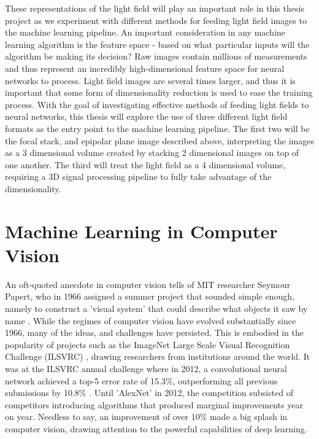 \documentclass[openany]{book}
\begin{document}
These representations of the light field will play an important role in this thesis project as we experiment with different methods for feeding light field images to the machine learning pipeline. An important consideration in any machine learning algorithm is the feature space - based on what particular inputs will the algorithm be making its decision? Raw images contain millions of measurements and thus represent an incredibly high-dimensional feature space for neural networks to process. Light field images are several times larger, and thus it is important that some form of dimensionality reduction is used to ease the training process. With the goal of investigating effective methods of feeding light fields to neural networks, this thesis will explore the use of three different light field formats as the entry point to the machine learning pipeline. The first two will be the focal stack, and epipolar plane image described above, interpreting the images as a 3 dimensional volume created by stacking 2 dimensional images on top of one another. The third will treat the light field as a 4 dimensional volume, requiring a 3D signal processing pipeline to fully take advantage of the dimensionality.

\section{Machine Learning in Computer Vision}


An oft-quoted anecdote in computer vision tells of MIT researcher Seymour Papert, who in 1966 assigned a summer project that sounded simple enough, namely to construct a 'visual system' that could describe what objects it saw by name \cite{papert1966vision}. While the regimes of computer vision have evolved substantially since 1966, many of the ideas, and challenges have persisted. This is embodied in the popularity of projects such as the ImageNet Large Scale Visual Recognition Challenge (ILSVRC) \cite{ilsvrc}, drawing researchers from institutions around the world. It was at the ILSVRC annual challenge where in 2012, a convolutional neural network achieved a top-5 error rate of 15.3\%, outperforming all previous submissions by 10.8\% \cite{krizhevsky2012alexnet}. Until 'AlexNet' in 2012, the competition subsisted of competitors introducing algorithms that produced marginal improvements year on year. Needless to say, an improvement of over 10\% made a big splash in computer vision, drawing attention to the powerful capabilities of deep learning.
\end{document}
